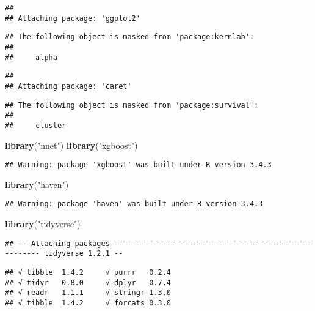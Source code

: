 \documentclass[]{article}
\newenvironment{Shaded}{\begin{snugshade}}{\end{snugshade}}
\newcommand{\KeywordTok}[1]{\textcolor[rgb]{0.13,0.29,0.53}{\textbf{#1}}}
\newcommand{\StringTok}[1]{\textcolor[rgb]{0.31,0.60,0.02}{#1}}
\newcommand{\NormalTok}[1]{#1}
\begin{document}
\begin{verbatim}
## 
## Attaching package: 'ggplot2'
\end{verbatim}

\begin{verbatim}
## The following object is masked from 'package:kernlab':
## 
##     alpha
\end{verbatim}

\begin{verbatim}
## 
## Attaching package: 'caret'
\end{verbatim}

\begin{verbatim}
## The following object is masked from 'package:survival':
## 
##     cluster
\end{verbatim}

\begin{Shaded}
\begin{Highlighting}[]
\KeywordTok{library}\NormalTok{(}\StringTok{"nnet"}\NormalTok{)}
\KeywordTok{library}\NormalTok{(}\StringTok{"xgboost"}\NormalTok{)}
\end{Highlighting}
\end{Shaded}

\begin{verbatim}
## Warning: package 'xgboost' was built under R version 3.4.3
\end{verbatim}

\begin{Shaded}
\begin{Highlighting}[]
\KeywordTok{library}\NormalTok{(}\StringTok{"haven"}\NormalTok{)}
\end{Highlighting}
\end{Shaded}

\begin{verbatim}
## Warning: package 'haven' was built under R version 3.4.3
\end{verbatim}

\begin{Shaded}
\begin{Highlighting}[]
\KeywordTok{library}\NormalTok{(}\StringTok{"tidyverse"}\NormalTok{) }
\end{Highlighting}
\end{Shaded}

\begin{verbatim}
## -- Attaching packages ----------------------------------------------------- tidyverse 1.2.1 --
\end{verbatim}

\begin{verbatim}
## √ tibble  1.4.2     √ purrr   0.2.4
## √ tidyr   0.8.0     √ dplyr   0.7.4
## √ readr   1.1.1     √ stringr 1.3.0
## √ tibble  1.4.2     √ forcats 0.3.0
\end{verbatim}
\end{document}
